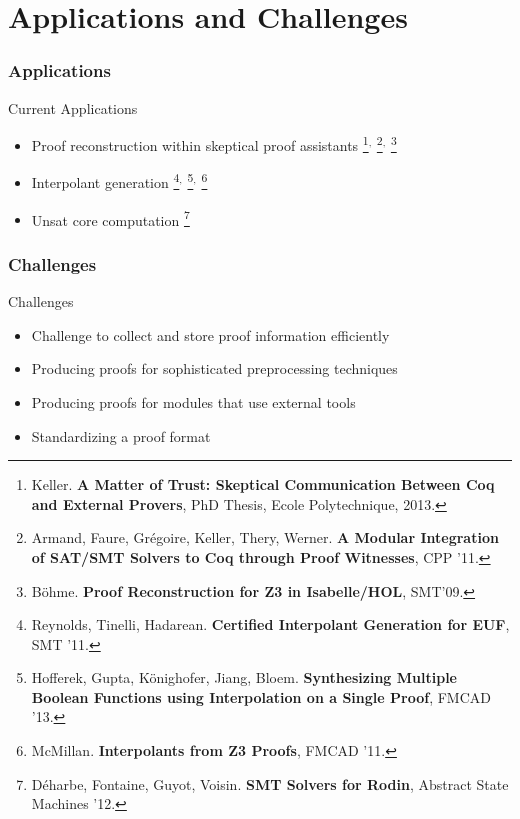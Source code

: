\documentclass[svgnames,table,mathserif]{beamer}
\begin{document}
\section{Applications and Challenges}

\begin{frame}\frametitle{Applications}

\begin{block}{Current Applications}
\begin{itemize}
\item Proof reconstruction within skeptical proof assistants
\footnote{
\tiny Keller. {\bf A Matter of Trust: Skeptical Communication Between Coq and
  External Provers}, PhD Thesis, Ecole Polytechnique, 2013.}$^{,}$
\footnote{
\tiny Armand, Faure, Gr{\'e}goire, Keller, Thery, Werner. {\bf A Modular
  Integration of SAT/SMT Solvers to Coq through Proof Witnesses}, CPP '11.}$^{,}$
\footnote{
\tiny B{\"o}hme. {\bf Proof Reconstruction for Z3 in Isabelle/HOL}, SMT'09.}

\item Interpolant generation
\footnote{
\tiny Reynolds, Tinelli, Hadarean. 
{\bf Certified Interpolant Generation for EUF}, SMT '11.}$^{,}$
\footnote{
\tiny Hofferek, Gupta, K\"{o}nighofer, Jiang, Bloem.
{\bf Synthesizing Multiple Boolean Functions using Interpolation on a Single
  Proof}, FMCAD '13.}$^{,}$
\footnote{
\tiny McMillan.
{\bf Interpolants from Z3 Proofs}, FMCAD '11.}

\item Unsat core computation
\footnote{\tiny D\'{e}harbe, Fontaine, Guyot, Voisin.
{\bf SMT Solvers for Rodin}, Abstract State Machines '12.}

\end{itemize}
\end{block}
\end{frame}

\begin{frame}\frametitle{Challenges}

\begin{block}{Challenges}
\begin{itemize}
\item Challenge to collect and store proof information efficiently
\item Producing proofs for sophisticated preprocessing techniques
\item Producing proofs for modules that use external tools
\item Standardizing a proof format
\end{itemize}
\end{block}
\end{frame}
\end{document}
